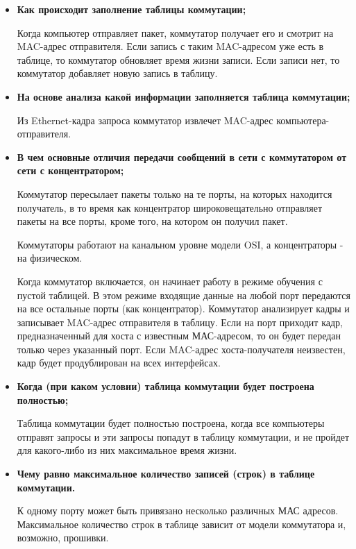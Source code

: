 \documentclass[12pt,onecolumn]{article}
\begin{document}
\begin{itemize}
  \item {
    \textbf{Как происходит заполнение таблицы коммутации;}

    Когда компьютер отправляет пакет, коммутатор получает его и смотрит на MAC-адрес отправителя. Если запись с таким MAC-адресом уже есть в таблице, то коммутатор обновляет время жизни записи. Если записи нет, то коммутатор добавляет новую запись в таблицу.
  }
  \item {
    \textbf{На основе анализа какой информации заполняется таблица коммутации;}

    Из Ethernet-кадра запроса коммутатор извлечет
    MAC-адрес компьютера-отправителя.
  }
  \item {
    \textbf{В чем основные отличия передачи сообщений в сети с коммутатором от сети с концентратором;}

    Коммутатор пересылает пакеты только на те порты, на которых находится получатель, в то время как концентратор широковещательно отправляет пакеты на все порты, кроме того, на котором он получил пакет.

    Коммутаторы работают на канальном уровне модели OSI, а концентраторы - на физическом.

    Когда коммутатор включается, он начинает работу в режиме обучения с пустой таблицей. В этом режиме входящие данные на любой порт передаются на все остальные порты (как концентратор). Коммутатор анализирует кадры и записывает MAC-адрес отправителя в таблицу. Если на порт приходит кадр, предназначенный для хоста с известным МАС-адресом, то он будет передан только через указанный порт. Если MAC-адрес хоста-получателя неизвестен, кадр будет продублирован на всех интерфейсах.

  }
  \item {
    \textbf{Когда (при каком условии) таблица коммутации будет построена полностью;}

    Таблица коммутации будет полностью построена, когда все компьютеры отправят запросы и эти запросы попадут в таблицу коммутации, и не пройдет для какого-либо из них максимальное время жизни. 
  }

  \item {
    \textbf{Чему равно максимальное количество записей (строк) в таблице коммутации.}

    К одному порту может быть привязано несколько
    различных МАС адресов. 
    Максимальное количество строк в таблице зависит от модели коммутатора и, возможно,
прошивки.
  }
\end{itemize}
\end{document}
